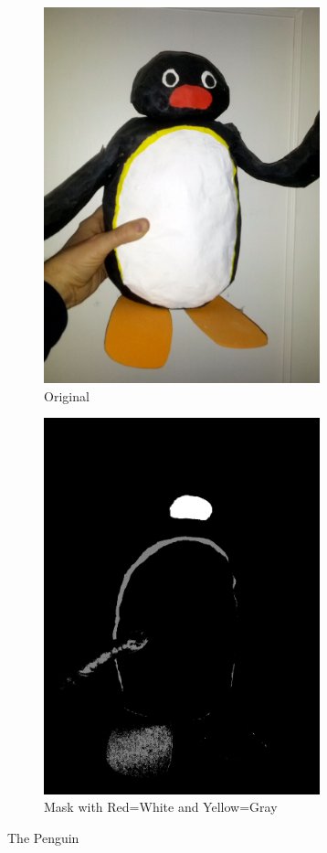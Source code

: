 \documentclass{article}
\begin{document}
\begin{enumerate}
\begin{figure}[h!]
\centering
\begin{subfigure}{.5\textwidth}
  \centering
  \includegraphics[width=80mm]{penguin.png}
  \caption{Original}
  \label{fig:sub1}
\end{subfigure}%
\begin{subfigure}{.5\textwidth}
  \centering
  \includegraphics[width=80mm]{detectRedAndYellowOnPenguin.png}
  \caption{Mask with Red=White and Yellow=Gray}
  \label{fig:sub2}
\end{subfigure}
\caption{The Penguin}
\label{fig:test}
\end{figure}


\end{enumerate}
\end{document}
